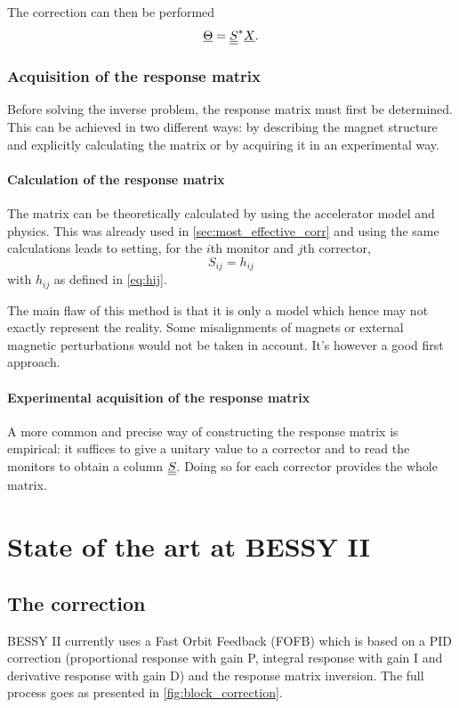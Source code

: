 The correction can then be performed
\begin{equation}
\underline{\Theta} = \underline{\underline{S}}^* \underline{X}.
\end{equation}

\subsubsection{Acquisition of the response matrix}
Before solving the inverse problem, the response matrix must first be determined. This can be achieved in two different ways: by describing the magnet structure and explicitly calculating the matrix or by acquiring it in an experimental way.

\paragraph{Calculation of the response matrix}
The matrix can be theoretically calculated by using the accelerator model and physics. This was already used in \cref{sec:most_effective_corr} and using the same calculations leads to setting, for the $i$th monitor and $j$th corrector,
\begin{equation}
S_{ij} = h_{ij}
\end{equation}
with $h_{ij}$ as defined in \cref{eq:hij}.

The main flaw of this method is that it is only a model which hence may not exactly represent the reality. Some misalignments of magnets or external magnetic perturbations would not be taken in account. It's however a good first approach.

\paragraph{Experimental acquisition of the response matrix}
A more common and precise way of constructing the response matrix is empirical: it suffices to give a unitary value to a corrector and to read the monitors to obtain a column $\underline{\underline{S}}$. Doing so for each corrector provides the whole matrix.


\section{State of the art at BESSY II}
\label{sec:correction_state_of_art}
\subsection{The correction}
BESSY II currently uses a Fast Orbit Feedback (FOFB) which is based on a PID correction (proportional response with gain P, integral response with gain I and derivative response with gain D) and the response matrix inversion. The full process goes as presented in \cref{fig:block_correction}.

